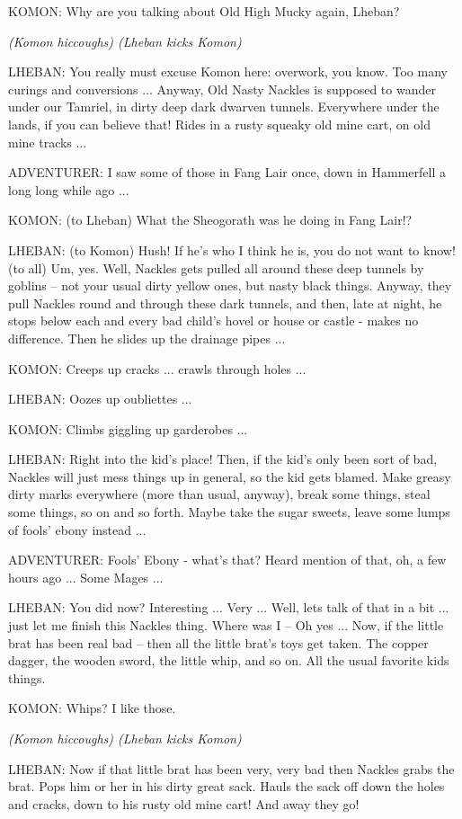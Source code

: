 KOMON: Why are you talking about Old High Mucky again, Lheban?

\textit{(Komon hiccoughs) (Lheban kicks Komon)}

LHEBAN: You really must excuse Komon here: overwork, you know. Too many curings and conversions ... Anyway, Old Nasty Nackles is supposed to wander under our Tamriel, in dirty deep dark dwarven tunnels. Everywhere under the lands, if you can believe that! Rides in a rusty squeaky old mine cart, on old mine tracks ...

ADVENTURER: I saw some of those in Fang Lair once, down in Hammerfell a long long while ago ...

KOMON: (to Lheban) What the Sheogorath was he doing in Fang Lair!?

LHEBAN: (to Komon) Hush! If he's who I think he is, you do not want to know! (to all) Um, yes. Well, Nackles gets pulled all around these deep tunnels by goblins -- not your usual dirty yellow ones, but nasty black things. Anyway, they pull Nackles round and through these dark tunnels, and then, late at night, he stops below each and every bad child's hovel or house or castle - makes no difference. Then he slides up the drainage pipes ...

KOMON: Creeps up cracks ... crawls through holes ...

LHEBAN: Oozes up oubliettes ...

KOMON: Climbs giggling up garderobes ...

LHEBAN: Right into the kid's place! Then, if the kid's only been sort of bad, Nackles will just mess things up in general, so the kid gets blamed. Make greasy dirty marks everywhere (more than usual, anyway), break some things, steal some things, so on and so forth. Maybe take the sugar sweets, leave some lumps of fools' ebony instead ...

ADVENTURER: Fools' Ebony - what's that? Heard mention of that, oh, a few hours ago ... Some Mages ...

LHEBAN: You did now? Interesting ... Very ... Well, lets talk of that in a bit ... just let me finish this Nackles thing. Where was I -- Oh yes ... Now, if the little brat has been real bad -- then all the little brat's toys get taken. The copper dagger, the wooden sword, the little whip, and so on. All the usual favorite kids things.

KOMON: Whips? I like those.

\textit{(Komon hiccoughs) (Lheban kicks Komon)}

LHEBAN: Now if that little brat has been very, very bad then Nackles grabs the brat. Pops him or her in his dirty great sack. Hauls the sack off down the holes and cracks, down to his rusty old mine cart! And away they go!

